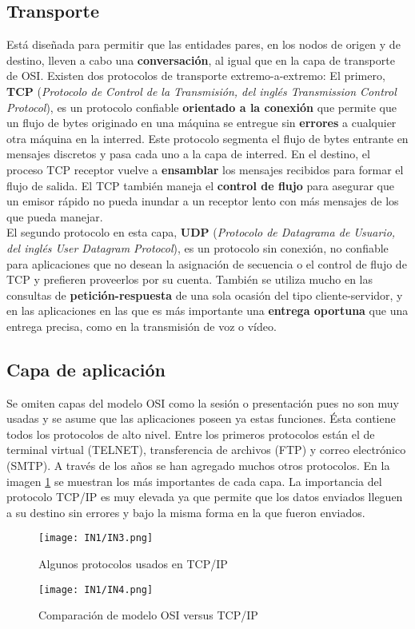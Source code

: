 \documentclass[
	11pt, %
	fleqn, %
	a4paper, %
]{LegrandOrangeBook}
\begin{document}
\subsection{Transporte}
Está diseñada para permitir que las entidades pares, en los nodos de origen y de destino, lleven a cabo una \textbf{conversación}, al igual que en la capa de transporte de OSI. Existen dos protocolos de transporte extremo-a-extremo: El primero, \textbf{TCP} (\textit{Protocolo de Control de la Transmisión, del inglés Transmission Control Protocol}), es un protocolo confiable \textbf{orientado a la conexión} que permite que un flujo de bytes originado en una máquina se entregue sin \textbf{errores} a cualquier otra máquina en la interred. Este protocolo segmenta el flujo de bytes entrante en mensajes discretos y pasa cada uno a la capa de interred. En el destino, el proceso TCP receptor vuelve a \textbf{ensamblar} los mensajes recibidos para formar el flujo de salida. El TCP también maneja el \textbf{control de flujo} para asegurar que un emisor rápido no pueda inundar a un receptor lento con más mensajes de los que pueda manejar.\\
El segundo protocolo en esta capa, \textbf{UDP} (\textit{Protocolo de Datagrama de Usuario, del inglés User Datagram Protocol}), es un protocolo sin conexión, no confiable para aplicaciones que no desean la asignación de secuencia o el control de flujo de TCP y prefieren proveerlos por su cuenta. También se utiliza mucho en las consultas de \textbf{petición-respuesta} de una sola ocasión del tipo cliente-servidor, y en las aplicaciones en las que es más importante una \textbf{entrega oportuna} que una entrega precisa, como en la transmisión de voz o vídeo.
\subsection{Capa de aplicación}
Se omiten capas del modelo OSI como la sesión o presentación pues no son muy usadas y se asume que las aplicaciones poseen ya estas funciones. Ésta contiene todos los protocolos de alto nivel. Entre los primeros protocolos están el de terminal virtual (TELNET), transferencia de archivos (FTP) y correo electrónico (SMTP). A través de los años se han agregado muchos otros protocolos. En la imagen \ref{fig:protocolos tcp ip} se muestran los más importantes de cada capa. La importancia del protocolo TCP/IP es muy elevada ya que permite que los datos enviados lleguen a su destino sin errores y bajo la misma forma en la que fueron enviados.
\begin{figure}[H]
\centering
\texttt{[image: IN1/IN3.png]}
\caption{Algunos protocolos usados en TCP/IP}
\label{fig:protocolos tcp ip}
\end{figure}
\begin{figure}[H]
\centering
\texttt{[image: IN1/IN4.png]}
\caption{Comparación de modelo OSI versus TCP/IP}
\label{fig:comparacion osi vs tcp}
\end{figure}
\newpage
\end{document}
